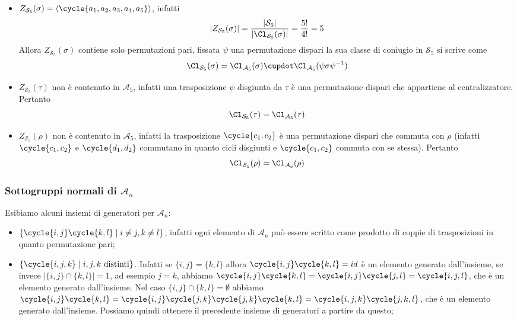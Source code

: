 \documentclass[11pt]{scrartcl}
\begin{document}
	\begin{itemize}
		\item $Z_{\mathcal{S}_5}(\sigma) = \langle\cycle{a_1, a_2, a_3, a_4, a_5}\rangle$,
		infatti 
		\[
		|Z_{\mathcal{S}_5}(\sigma)| = \frac{|\mathcal{S}_5|}{|\Cl_{\mathcal{S}_5}(\sigma)|} = \frac{5!}{4!} = 5
		\]
		Allora $Z_{\mathcal{S}_5}(\sigma)$ contiene solo permutazioni pari, fissata $\psi$
		una permutazione dispari la sua
		classe di coniugio in $\mathcal{S}_5$ si scrive come
		\[
		\Cl_{\mathcal{S}_5}(\sigma) = \Cl_{\mathcal{A}_5}(\sigma) \cupdot \Cl_{\mathcal{A}_5}(\psi\sigma\psi^{-1})
		\]
		\item $Z_{\mathcal{S}_5}(\tau)$ non è contenuto in $\mathcal{A}_5$, infatti una
		trasposizione $\psi$ disgiunta da $\tau$ è una permutazione dispari che
		appartiene al centralizzatore. Pertanto
		\[
		\Cl_{\mathcal{S}_5}(\tau) = \Cl_{\mathcal{A}_5}(\tau)
		\]
		\item $Z_{\mathcal{S}_5}(\rho)$ non è contenuto in $\mathcal{A}_5$, infatti la 
		trasposizione $\cycle{c_1, c_2}$ è una permutazione dispari che commuta
		con $\rho$ (infatti $\cycle{c_1, c_2}$ e $\cycle{d_1, d_2}$ commutano in 
		quanto cicli disgiunti e $\cycle{c_1, c_2}$ commuta con se stessa).
		Pertanto 
		\[
		\Cl_{\mathcal{S}_5}(\rho) = \Cl_{\mathcal{A}_5}(\rho)
		\]
	\end{itemize}
	
	\subsubsection{Sottogruppi normali di $\mathcal{A}_n$}
	
	Esibiamo alcuni insiemi di generatori per $\mathcal{A}_n$:
	\begin{itemize}
		\item $\{\cycle{i, j}\cycle{k, l}\mid i\neq j, k \neq l\}$, infatti
		ogni elemento di $\mathcal{A}_n$ può essere scritto come prodotto di 
		coppie di trasposizioni in quanto permutazione pari;
		\item $\{\cycle{i, j, k}\mid i, j, k\text{ distinti}\}$. Infatti se 
		$\{i, j\} = \{k, l\}$ allora $\cycle{i, j}\cycle{k, l} = id$ è un elemento
		generato dall'insieme, se invece $|\{i, j\}\cap\{k, l\}| = 1$, ad esempio $j = k$,
		abbiamo $\cycle{i, j}\cycle{k, l} = \cycle{i, j}\cycle{j, l} = \cycle{i, j, l}$,
		che è un elemento generato dall'insieme. Nel caso $\{i, j\}\cap \{k, l\} = \emptyset$ abbiamo
		$\cycle{i, j}\cycle{k, l} = \cycle{i, j}\cycle{j, k}\cycle{j, k}\cycle{k, l}=
		\cycle{i, j, k}\cycle{j, k, l}$, che è un elemento generato dall'insieme.
		Possiamo quindi ottenere il precedente insieme di generatori a partire
		da questo;
	\end{itemize}
	
\end{document}
